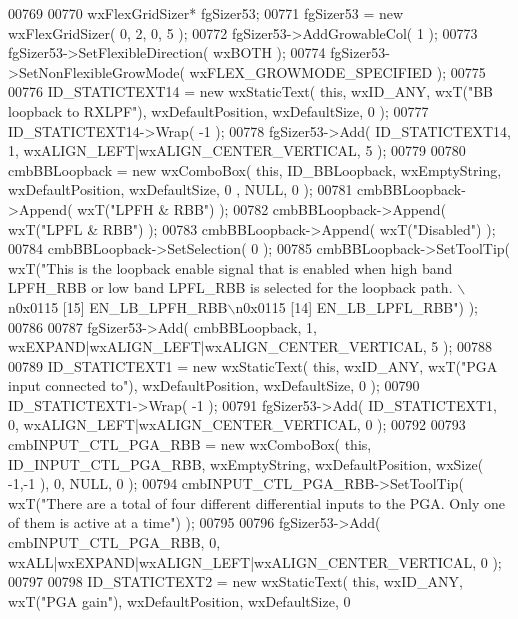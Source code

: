 \begin{DoxyCode}
00769     
00770     wxFlexGridSizer* fgSizer53;
00771     fgSizer53 = \textcolor{keyword}{new} wxFlexGridSizer( 0, 2, 0, 5 );
00772     fgSizer53->AddGrowableCol( 1 );
00773     fgSizer53->SetFlexibleDirection( wxBOTH );
00774     fgSizer53->SetNonFlexibleGrowMode( wxFLEX\_GROWMODE\_SPECIFIED );
00775     
00776     ID_STATICTEXT14 = \textcolor{keyword}{new} wxStaticText( \textcolor{keyword}{this}, wxID\_ANY, wxT(\textcolor{stringliteral}{"BB loopback to RXLPF"}), wxDefaultPosition, 
      wxDefaultSize, 0 );
00777     ID_STATICTEXT14->Wrap( -1 );
00778     fgSizer53->Add( ID_STATICTEXT14, 1, wxALIGN\_LEFT|wxALIGN\_CENTER\_VERTICAL, 5 );
00779     
00780     cmbBBLoopback = \textcolor{keyword}{new} wxComboBox( \textcolor{keyword}{this}, ID_BBLoopback, wxEmptyString, wxDefaultPosition, wxDefaultSize, 0
      , NULL, 0 );
00781     cmbBBLoopback->Append( wxT(\textcolor{stringliteral}{"LPFH & RBB"}) );
00782     cmbBBLoopback->Append( wxT(\textcolor{stringliteral}{"LPFL & RBB"}) );
00783     cmbBBLoopback->Append( wxT(\textcolor{stringliteral}{"Disabled"}) );
00784     cmbBBLoopback->SetSelection( 0 );
00785     cmbBBLoopback->SetToolTip( wxT(\textcolor{stringliteral}{"This is the loopback enable signal that is enabled when high band
       LPFH\_RBB or low band LPFL\_RBB  is selected for the loopback path. \(\backslash\)n0x0115 [15] EN\_LB\_LPFH\_RBB\(\backslash\)n0x0115 [14]
       EN\_LB\_LPFL\_RBB"}) );
00786     
00787     fgSizer53->Add( cmbBBLoopback, 1, wxEXPAND|wxALIGN\_LEFT|wxALIGN\_CENTER\_VERTICAL, 5 );
00788     
00789     ID_STATICTEXT1 = \textcolor{keyword}{new} wxStaticText( \textcolor{keyword}{this}, wxID\_ANY, wxT(\textcolor{stringliteral}{"PGA input connected to"}), wxDefaultPosition, 
      wxDefaultSize, 0 );
00790     ID_STATICTEXT1->Wrap( -1 );
00791     fgSizer53->Add( ID_STATICTEXT1, 0, wxALIGN\_LEFT|wxALIGN\_CENTER\_VERTICAL, 0 );
00792     
00793     cmbINPUT_CTL_PGA_RBB = \textcolor{keyword}{new} wxComboBox( \textcolor{keyword}{this}, ID_INPUT_CTL_PGA_RBB, wxEmptyString, wxDefaultPosition, 
      wxSize( -1,-1 ), 0, NULL, 0 ); 
00794     cmbINPUT_CTL_PGA_RBB->SetToolTip( wxT(\textcolor{stringliteral}{"There are a total of four different differential inputs to the
       PGA. Only one of them is active at a time"}) );
00795     
00796     fgSizer53->Add( cmbINPUT_CTL_PGA_RBB, 0, wxALL|wxEXPAND|wxALIGN\_LEFT|wxALIGN\_CENTER\_VERTICAL, 0 );
00797     
00798     ID_STATICTEXT2 = \textcolor{keyword}{new} wxStaticText( \textcolor{keyword}{this}, wxID\_ANY, wxT(\textcolor{stringliteral}{"PGA gain"}), wxDefaultPosition, wxDefaultSize, 0

\end{DoxyCode}
